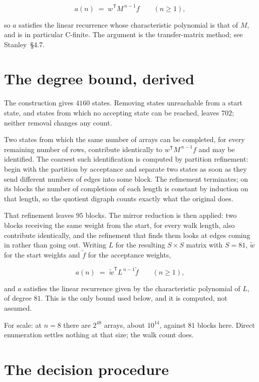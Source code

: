 \documentclass[11pt]{article}
\theoremstyle{definition}
\begin{document}
\[a(n) \;=\; w^{\mathsf T} M^{\,n-1} f \qquad (n \ge 1),\]

so $a$ satisfies the linear recurrence whose characteristic polynomial is that of $M$, and is in particular C-finite. The argument is the transfer-matrix method; see Stanley~\S4.7.

\section{The degree bound, derived}

The construction gives $4160$ states. Removing states unreachable from a start state, and states from which no accepting state can be reached, leaves $702$; neither removal changes any count.

Two states from which the same number of arrays can be completed, for every remaining number of rows, contribute identically to $w^{\mathsf T}M^{\,n-1}f$ and may be identified. The coarsest such identification is computed by partition refinement: begin with the partition by acceptance and separate two states as soon as they send different numbers of edges into some block. The refinement terminates; on its blocks the number of completions of each length is constant by induction on that length, so the quotient digraph counts exactly what the original does.

That refinement leaves $95$ blocks. The mirror reduction is then applied: two blocks receiving the same weight from the start, for every walk length, also contribute identically, and the refinement that finds them looks at edges coming in rather than going out. Writing $L$ for the resulting $S \times S$ matrix with $S = 81$, $\tilde w$ for the start weights and $\tilde f$ for the acceptance weights,

\[a(n) \;=\; \tilde w^{\mathsf T} L^{\,n-1} \tilde f \qquad (n \ge 1),\]

and $a$ satisfies the linear recurrence given by the characteristic polynomial of $L$, of degree $81$. This is the only bound used below, and it is computed, not assumed.

For scale: at $n = 8$ there are $2^{48}$ arrays, about $10^{14}$, against $81$ blocks here. Direct enumeration settles nothing at that size; the walk count does.

\section{The decision procedure}
\end{document}
